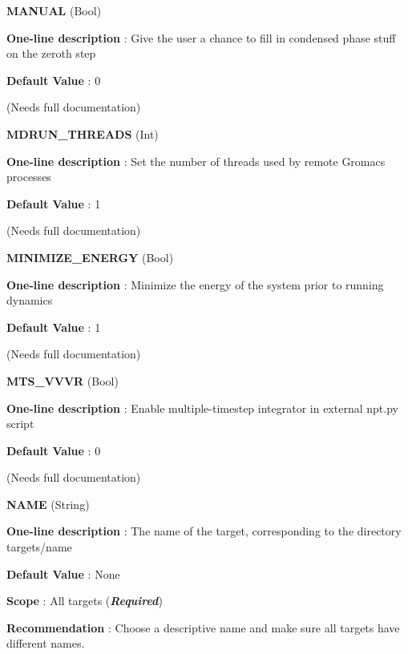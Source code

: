 \begin{DoxyItemize}
\item {\bfseries  M\-A\-N\-U\-A\-L } (Bool) \par
{\bfseries  One-\/line description }\-: Give the user a chance to fill in condensed phase stuff on the zeroth step \par
{\bfseries  Default Value }\-: 0 \par
(Needs full documentation)\end{DoxyItemize}
\begin{DoxyItemize}
\item {\bfseries  M\-D\-R\-U\-N\-\_\-\-T\-H\-R\-E\-A\-D\-S } (Int) \par
{\bfseries  One-\/line description }\-: Set the number of threads used by remote Gromacs processes \par
{\bfseries  Default Value }\-: 1 \par
(Needs full documentation)\end{DoxyItemize}
\begin{DoxyItemize}
\item {\bfseries  M\-I\-N\-I\-M\-I\-Z\-E\-\_\-\-E\-N\-E\-R\-G\-Y } (Bool) \par
{\bfseries  One-\/line description }\-: Minimize the energy of the system prior to running dynamics \par
{\bfseries  Default Value }\-: 1 \par
(Needs full documentation)\end{DoxyItemize}
\begin{DoxyItemize}
\item {\bfseries  M\-T\-S\-\_\-\-V\-V\-V\-R } (Bool) \par
{\bfseries  One-\/line description }\-: Enable multiple-\/timestep integrator in external npt.\-py script \par
{\bfseries  Default Value }\-: 0 \par
(Needs full documentation)\end{DoxyItemize}
\begin{DoxyItemize}
\item {\bfseries  N\-A\-M\-E } (String) \par
{\bfseries  One-\/line description }\-: The name of the target, corresponding to the directory targets/name \par
{\bfseries  Default Value }\-: None \par
{\bfseries  Scope }\-: All targets ({\bfseries {\itshape Required}}) \par
{\bfseries  Recommendation }\-: Choose a descriptive name and make sure all targets have different names.\end{DoxyItemize}
